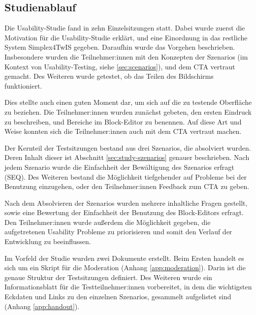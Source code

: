\subsection{Studienablauf}

Die Usability-Studie fand in zehn Einzelsitzungen statt. Dabei wurde zuerst die Motivation für die Usability-Studie erklärt, und eine Einordnung in das restliche System Simplex4TwIS gegeben. Daraufhin wurde das Vorgehen beschrieben. Insbesondere wurden die Teilnehmer:innen mit den Konzepten der Szenarios (im Kontext von Usability-Testing, siehe \ref{sec:scenarios}), und dem \ac{CTA} vertraut gemacht. Des Weiteren wurde getestet, ob das Teilen des Bildschirms funktioniert.

Dies stellte auch einen guten Moment dar, um sich auf die zu testende Oberfläche zu beziehen. Die Teilnehmer:innen wurden zunächst gebeten, den ersten Eindruck zu beschreiben, und Bereiche im Block-Editor zu benennen. Auf diese Art und Weise konnten sich die Teilnehmer:innen auch mit dem \ac{CTA} vertraut machen.

Der Kernteil der Testsitzungen bestand aus drei Szenarios, die absolviert wurden. Deren Inhalt dieser ist Abschnitt \ref{sec:study-szenarios} genauer beschrieben. Nach jedem Szenario wurde die Einfachheit der Bewältigung des Szenarios erfragt (\ac{SEQ}). Des Weiteren bestand die Möglichkeit tiefgehender auf Probleme bei der Benutzung einzugehen, oder den Teilnehmer:innen Feedback zum \ac{CTA} zu geben.

Nach dem Absolvieren der Szenarios wurden mehrere inhaltliche Fragen gestellt, sowie eine Bewertung der Einfachheit der Benutzung des Block-Editors erfragt. Den Teilnehmer:innen wurde außerdem die Möglichkeit gegeben, die aufgetretenen Usability Probleme zu priorisieren und somit den Verlauf der Entwicklung zu beeinflussen.

Im Vorfeld der Studie wurden zwei Dokumente erstellt. Beim Ersten handelt es sich um ein Skript für die Moderation (Anhang \ref{app:moderation}). Darin ist die genaue Struktur der Testsitzungen definiert. Des Weiteren wurde ein Informationsblatt für die Testteilnehmer:innen vorbereitet, in dem die wichtigsten Eckdaten und Links zu den einzelnen Szenarios, gesammelt aufgelistet sind (Anhang \ref{app:handout}).
